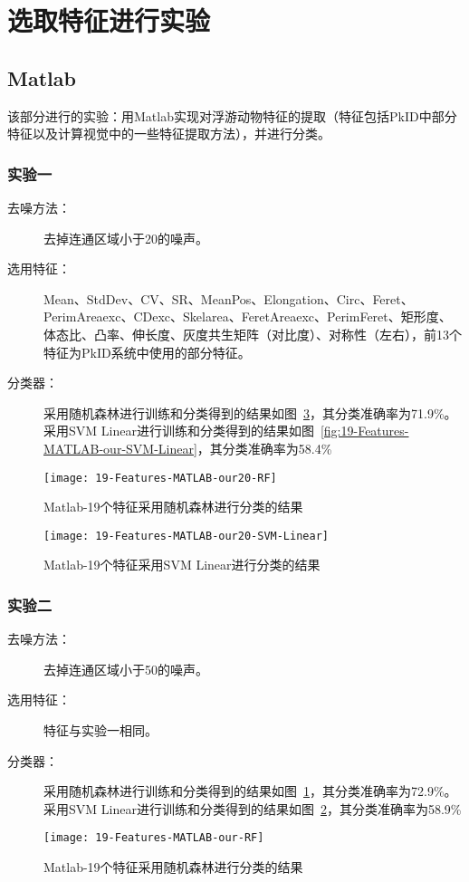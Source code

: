 \section{选取特征进行实验}
\subsection{Matlab}
该部分进行的实验：用Matlab实现对浮游动物特征的提取（特征包括PkID中部分特征以及计算视觉中的一些特征提取方法），并进行分类。

\subsubsection{实验一}
\begin{description}
\item[去噪方法：] 去掉连通区域小于20的噪声。
\item[选用特征：] Mean、StdDev、CV、SR、MeanPos、Elongation、Circ、Feret、PerimAreaexc、CDexc、Skelarea、FeretAreaexc、PerimFeret、矩形度、体态比、凸率、伸长度、灰度共生矩阵（对比度）、对称性（左右），前13个特征为PkID系统中使用的部分特征。
\item[分类器：] 采用随机森林进行训练和分类得到的结果如图~\ref{fig:19-Features-MATLAB-our-RF}，其分类准确率为71.9\%。采用SVM Linear进行训练和分类得到的结果如图~\ref{fig:19-Features-MATLAB-our-SVM-Linear}，其分类准确率为58.4\%
\end{description}
\begin{figure}[!ht]
\centering
\texttt{[image: 19-Features-MATLAB-our20-RF]}
\caption{Matlab-19个特征采用随机森林进行分类的结果}
\label{fig:19-Features-MATLAB-our20-RF}
\end{figure}

\begin{figure}[!ht]
\centering
\texttt{[image: 19-Features-MATLAB-our20-SVM-Linear]}
\caption{Matlab-19个特征采用SVM Linear进行分类的结果}
\label{fig:19-Features-MATLAB-our20-SVM-Linear}
\end{figure}

\subsubsection{实验二}
\begin{description}
\item[去噪方法：] 去掉连通区域小于50的噪声。
\item[选用特征：] 特征与实验一相同。
\item[分类器：] 采用随机森林进行训练和分类得到的结果如图~\ref{fig:19-Features-MATLAB-our20-RF}，其分类准确率为72.9\%。采用SVM Linear进行训练和分类得到的结果如图~\ref{fig:19-Features-MATLAB-our20-SVM-Linear}，其分类准确率为58.9\%
\end{description}
\begin{figure}[!ht]
\centering
\texttt{[image: 19-Features-MATLAB-our-RF]}
\caption{Matlab-19个特征采用随机森林进行分类的结果}
\label{fig:19-Features-MATLAB-our-RF}
\end{figure}

